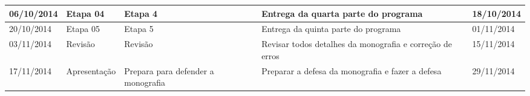 \documentclass[
	12pt,				%
	openright,			%
	twoside,			%
	a4paper,			%
	Times,
	brazil,				%
	]{abntex2}
\begin{document}
\begin{apendicesenv}
\begin{center}
\begin{tabularx}{\textwidth}{|X|X|X|X|X|}
		06/10/2014 & Etapa 04 & Etapa 4 & Entrega da quarta parte do programa & 18/10/2014 \\ \hline
		
		20/10/2014 & Etapa 05 & Etapa 5 & Entrega da quinta parte do programa & 01/11/2014 \\ \hline

		03/11/2014 & Revisão & Revisão & Revisar todos detalhes da monografia e correção de erros & 15/11/2014 \\ \hline

		17/11/2014 & Apresentação & Prepara para defender a monografia & Preparar a defesa da monografia e fazer a defesa & 29/11/2014 \\ \hline

		
	\hline
	\end{tabularx}
\end{center}

\end{apendicesenv}



%
%
%
%
%
%
%



\printindex
\end{document}
